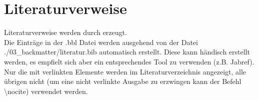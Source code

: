 %
\section{Literaturverweise}\label{sec:literaturverweise}
%
Literaturverweise werden durch \cite{ein_artikel} erzeugt.\\
Die Einträge in der .bbl Datei werden ausgehend von der Datei ./03\_backmatter/literatur.bib automatisch erstellt.
Diese kann händisch erstellt werden, es empfielt sich aber ein entsprechendes Tool zu verwenden (z.B. Jabref).\\
Nur die mit verlinkten Elemente werden im Literaturverzeichnis angezeigt, alle übrigen nicht 
(um eine nicht verlinkte Ausgabe zu erzwingen kann der Befehl \textbackslash nocite) verwendet werden.
\nocite{eine_doktorarbeit}
%
\newpage
%
